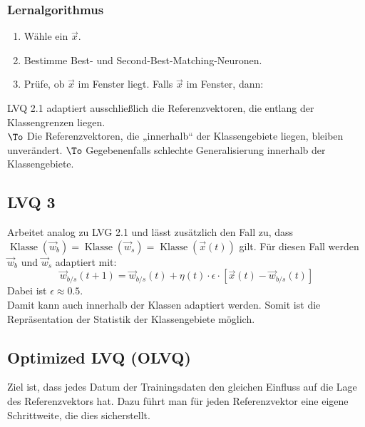 \subsubsection*{Lernalgorithmus}
\begin{enumerate}
\item Wähle ein $\vec{x}$.
\item Bestimme Best- und Second-Best-Matching-Neuronen.
\item Prüfe, ob $\vec{x}$ im Fenster liegt. Falls $\vec{x}$ im Fenster, dann:
\end{enumerate}
LVQ 2.1 adaptiert ausschließlich die Referenzvektoren, die entlang der Klassengrenzen liegen.\\
$\To$ Die Referenzvektoren, die „innerhalb“ der Klassengebiete liegen, bleiben unverändert. $\To$ Gegebenenfalls schlechte Generalisierung innerhalb der Klassengebiete.

\subsection{LVQ 3}
Arbeitet analog zu LVG 2.1 und lässt zusätzlich den Fall zu, dass $\operatorname{Klasse}(\vec{w}_b) = \operatorname{Klasse}(\vec{w}_s) = \operatorname{Klasse} (\vec{x}(t))$ gilt. Für diesen Fall werden $\vec{w}_b$ und $\vec{w}_s$ adaptiert mit:
$$\vec{w}_{b/s}(t+1)=\vec{w}_{b/s}(t)+\eta(t) \cdot \epsilon \cdot \left[\vec{x}(t)-\vec{w}_{b/s}(t)\right]$$
Dabei ist $\epsilon \approx 0.5$.\\
Damit kann auch innerhalb der Klassen adaptiert werden. Somit ist die Repräsentation der Statistik der Klassengebiete möglich.

\subsection{Optimized LVQ (OLVQ)}
Ziel ist, dass jedes Datum der Trainingsdaten den gleichen Einfluss auf die Lage des Referenzvektors hat. Dazu führt man für jeden Referenzvektor eine eigene Schrittweite, die dies sicherstellt.

